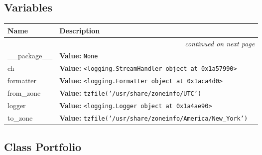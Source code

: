 
  \subsection{Variables}

    \vspace{-1cm}
\hspace{\varindent}\begin{longtable}{|p{\varnamewidth}|p{\vardescrwidth}|l}
\cline{1-2}
\cline{1-2} \centering \textbf{Name} & \centering \textbf{Description}& \\
\cline{1-2}
\endhead\cline{1-2}\multicolumn{3}{r}{\small\textit{continued on next page}}\\\endfoot\cline{1-2}
\endlastfoot\raggedright \_\-\_\-p\-a\-c\-k\-a\-g\-e\-\_\-\_\- & \raggedright \textbf{Value:} 
{\tt None}&\\
\cline{1-2}
\raggedright c\-h\- & \raggedright \textbf{Value:} 
{\tt {\textless}logging.StreamHandler object at 0x1a57990{\textgreater}}&\\
\cline{1-2}
\raggedright f\-o\-r\-m\-a\-t\-t\-e\-r\- & \raggedright \textbf{Value:} 
{\tt {\textless}logging.Formatter object at 0x1aca4d0{\textgreater}}&\\
\cline{1-2}
\raggedright f\-r\-o\-m\-\_\-z\-o\-n\-e\- & \raggedright \textbf{Value:} 
{\tt tzfile('/usr/share/zoneinfo/UTC')}&\\
\cline{1-2}
\raggedright l\-o\-g\-g\-e\-r\- & \raggedright \textbf{Value:} 
{\tt {\textless}logging.Logger object at 0x1a4ae90{\textgreater}}&\\
\cline{1-2}
\raggedright t\-o\-\_\-z\-o\-n\-e\- & \raggedright \textbf{Value:} 
{\tt tzfile('/usr/share/zoneinfo/America/New\_York')}&\\
\cline{1-2}
\end{longtable}



\subsection{Class Portfolio}

